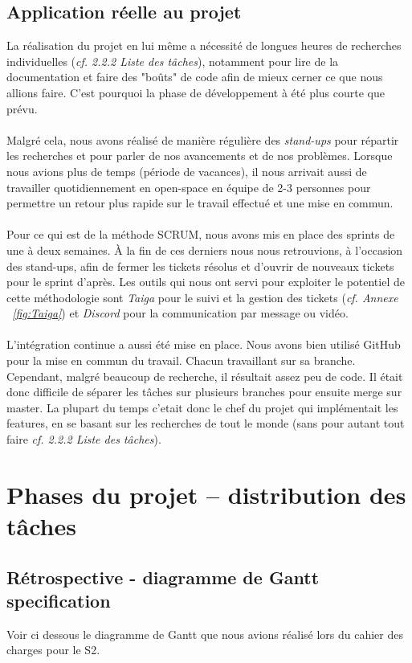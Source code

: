 \documentclass[french]{report}
\begin{document}
\subsection{Application réelle au projet}
La réalisation du projet en lui même a nécessité de longues heures de recherches
individuelles (\emph{cf. 2.2.2 Liste des tâches}), notamment pour lire de la documentation et faire des "boûts" de
code afin de mieux cerner ce que nous allions faire. C'est pourquoi la phase de développement à
été plus courte que prévu.
\\
\\
Malgré cela, nous avons réalisé de manière régulière des \emph{stand-ups} pour
répartir les recherches et pour parler de nos avancements et de nos problèmes.
Lorsque nous avions
plus de temps (période de vacances), il nous arrivait aussi de travailler
quotidiennement en open-space en équipe de 2-3 personnes pour permettre un
retour plus rapide sur le travail effectué et une mise en commun.
\\
\\
Pour ce qui est de la méthode SCRUM, nous avons mis en place des sprints de une
à deux semaines. À la fin de ces derniers nous nous retrouvions, à
l'occasion des stand-ups, afin de fermer les tickets résolus et d’ouvrir de
nouveaux tickets pour le sprint d’après. Les outils qui nous ont servi
pour exploiter le potentiel de cette méthodologie
sont \emph{Taiga} pour le suivi et la gestion des tickets (\emph{cf. Annexe ~\ref{fig:Taiga}})
et \emph{Discord} pour la communication par message ou vidéo.
\\
\\
L'intégration continue a aussi été mise en place. Nous avons bien
utilisé GitHub pour la mise en commun du travail. Chacun travaillant sur sa
branche. Cependant, malgré beaucoup de recherche, il résultait assez peu de code. Il
était donc difficile de séparer les tâches sur plusieurs branches pour ensuite
merge sur master. La plupart du temps c'etait donc le chef du projet qui
implémentait les features, en se basant sur les recherches de tout le monde (sans
pour autant tout faire \emph{cf. 2.2.2 Liste des tâches}).

\section{Phases du projet – distribution des tâches}

\subsection{Rétrospective - diagramme de Gantt specification}
Voir ci dessous le diagramme de Gantt que nous avions réalisé lors du cahier
des charges pour le S2.
\end{document}
